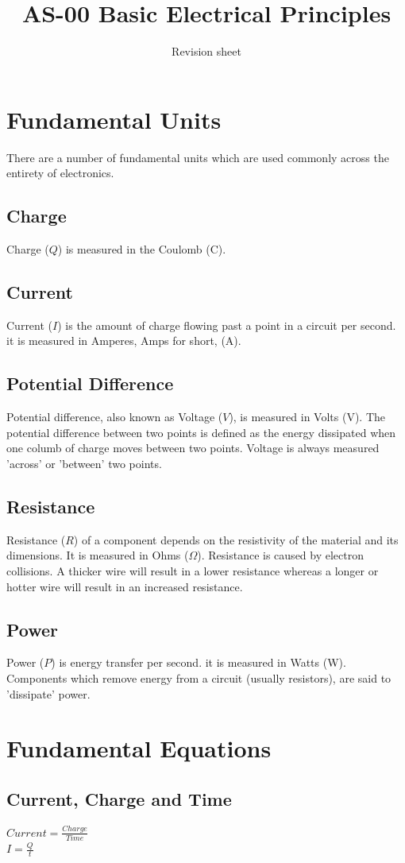 \documentclass[a4paper,11pt, twocolumn]{article}
\title{AS-00 Basic Electrical Principles}
\author{Revision sheet}
\date{}
\begin{document}
\maketitle
\thispagestyle{fancy}

\section{Fundamental Units}
There are a number of fundamental units which are used commonly across the entirety of electronics.
\subsection{Charge}
Charge ($Q$) is measured in the Coulomb (C). 
\subsection{Current}
Current ($I$)  is the amount of charge flowing past a point in a circuit per second. it is measured in Amperes, Amps for short, (A).
\subsection{Potential Difference}
Potential difference, also known as Voltage ($V$), is measured in Volts (V). The potential difference between two points is defined as the energy dissipated when one columb of charge moves between two points. Voltage is always measured 'across' or 'between' two points. 
\subsection{Resistance}
Resistance ($R$) of a component depends on the resistivity of the material and its dimensions. It is measured in Ohms ($\Omega$). Resistance is caused by electron collisions. A thicker wire will result in a lower resistance whereas a longer or hotter wire will result in an increased resistance.
\subsection{Power}
Power ($P$) is energy transfer per second. it is measured in Watts (W). Components which remove energy from a circuit (usually resistors), are said to 'dissipate' power.

\section{Fundamental Equations}
\subsection{Current, Charge and Time}
$\displaystyle Current = \frac{Charge}{Time}$\\
$\displaystyle I=\frac{Q}{t}$\\
\end{document}
